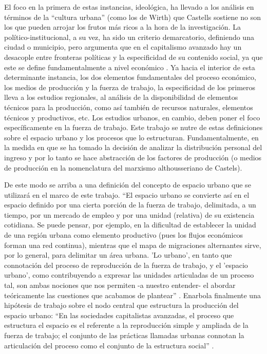 	El foco en la primera de estas instancias, ideológica, ha llevado a los análisis en términos de la “cultura urbana” (como los de Wirth) que Castells sostiene no son los que pueden arrojar los frutos más ricos a la hora de la investigación. La político-institucional, a su vez, ha sido un criterio demarcatorio, definiendo una ciudad o municipio, pero argumenta que en el capitalismo avanzado hay un desacople entre fronteras políticas y la especificidad de su contenido social, ya que este se define fundamentalmente a nivel económico \cite[p.~278]{castells}. Ya hacia el interior de esta determinante instancia, los dos elementos fundamentales del proceso económico, los medios de producción y la fuerza de trabajo, la especificidad de los primeros lleva a los estudios regionales, al análisis de la disponibilidad de elementos técnicos para la producción, como así también de recursos naturales, elementos técnicos y productivos, etc. Los estudios urbanos, en cambio, deben poner el foco específicamente en la fuerza de trabajo. Este trabajo se nutre de estas definiciones sobre el espacio urbano y los procesos que lo estructuran. Fundamentalmente, en la medida en que se ha tomado la decisión de analizar la distribución personal del ingreso y por lo tanto se hace abstracción de los factores de producción (o medios de producción en la nomenclatura del marxismo althousseriano de Castels).
	
	De este modo se arriba a una definición del concepto de espacio urbano que se utilizará en el marco de este trabajo. “El espacio urbano se convierte así en el espacio definido por una cierta porción de la fuerza de trabajo, delimitada, a un tiempo, por un mercado de empleo y por una unidad (relativa) de su existencia cotidiana. Se puede pensar, por ejemplo, en la dificultad de establecer la unidad de una región urbana como elemento productivo (pues los flujos económicos forman una red continua), mientras que el mapa de migraciones alternantes sirve, por lo general, para delimitar un área urbana. 'Lo urbano', en tanto que connotación del proceso de reproducción de la fuerza de trabajo, y el 'espacio urbano', como contribuyendo a expresar las unidades articuladas de un proceso tal, son ambas nociones que nos permiten -a nuestro entender- el abordar teóricamente las cuestiones que acabamos de plantear” \cite[p.~279]{castells}. Enarbola finalmente una hipótesis de trabajo sobre el nodo central que estructura la producción del espacio urbano: “En las sociedades capitalistas avanzadas, el proceso que estructura el espacio es el referente a la reproducción simple y ampliada de la fuerza de trabajo; el conjunto de las prácticas llamadas urbanas connotan la articulación del proceso como el conjunto de la estructura social” \cite[p.~280]{castells}. 
	
